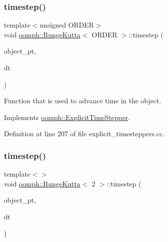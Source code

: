\mbox{\label{classoomph_1_1RungeKutta_a53a492b4190ccd3dfc0b4af35b2c240f}} 
\subsubsection{\texorpdfstring{timestep()}{timestep()}\hspace{0.1cm}{\footnotesize\ttfamily [2/3]}}
{\footnotesize\ttfamily template$<$unsigned O\+R\+D\+ER$>$ \\
void \hyperlink{classoomph_1_1RungeKutta}{oomph\+::\+Runge\+Kutta}$<$ O\+R\+D\+ER $>$\+::timestep (\begin{DoxyParamCaption}\item[{\hyperlink{classoomph_1_1ExplicitTimeSteppableObject}{Explicit\+Time\+Steppable\+Object} $\ast$const \&}]{object\+\_\+pt,  }\item[{const double \&}]{dt }\end{DoxyParamCaption})\hspace{0.3cm}{\ttfamily [virtual]}}



Function that is used to advance time in the object. 



Implements \hyperlink{classoomph_1_1ExplicitTimeStepper_ab43bbab17960d0f50b8842e996f5c765}{oomph\+::\+Explicit\+Time\+Stepper}.



Definition at line 207 of file explicit\+\_\+timesteppers.\+cc.

\mbox{\label{classoomph_1_1RungeKutta_a41922b5bf83c9a719106cbb7b862ee51}} 
\subsubsection{\texorpdfstring{timestep()}{timestep()}\hspace{0.1cm}{\footnotesize\ttfamily [3/3]}}
{\footnotesize\ttfamily template$<$$>$ \\
void \hyperlink{classoomph_1_1RungeKutta}{oomph\+::\+Runge\+Kutta}$<$ 2 $>$\+::timestep (\begin{DoxyParamCaption}\item[{\hyperlink{classoomph_1_1ExplicitTimeSteppableObject}{Explicit\+Time\+Steppable\+Object} $\ast$const \&}]{object\+\_\+pt,  }\item[{const double \&}]{dt }\end{DoxyParamCaption})\hspace{0.3cm}{\ttfamily [virtual]}}



